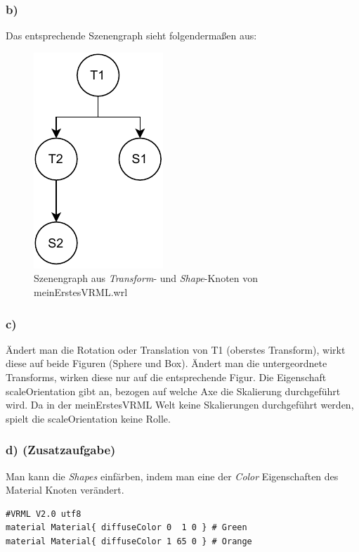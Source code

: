 \documentclass{article}
\begin{document}
\subsubsection*{b)}
Das entsprechende Szenengraph sieht folgendermaßen aus:

\begin{figure}[!!h]
    \centering
    \includegraphics{V1_SceneGraph.pdf}
    \caption{Szenengraph aus \textit{Transform}- und \textit{Shape}-Knoten von meinErstesVRML.wrl}
\end{figure}


\subsubsection*{c)}
Ändert man die Rotation oder Translation von T1 (oberstes Transform), wirkt 
diese auf beide Figuren (Sphere und Box). Ändert man die untergeordnete
Transforms, wirken diese nur auf die entsprechende Figur. Die Eigenschaft
scaleOrientation gibt an, bezogen auf welche Axe die Skalierung durchgeführt
wird. Da in der meinErstesVRML Welt keine Skalierungen durchgeführt werden, 
spielt die scaleOrientation keine Rolle.

\subsubsection*{d) (Zusatzaufgabe)}
Man kann die \textit{Shapes} einfärben, indem man eine der \textit{Color}
Eigenschaften des Material Knoten verändert. 

\begin{lstlisting}[language=VRML]
#VRML V2.0 utf8
material Material{ diffuseColor 0  1 0 } # Green
material Material{ diffuseColor 1 65 0 } # Orange
\end{lstlisting}
\end{document}

